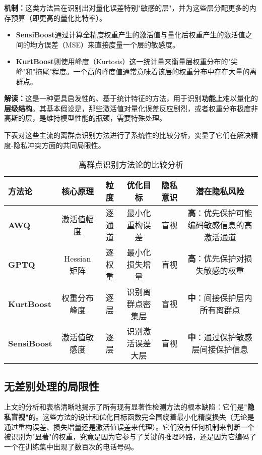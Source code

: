 \documentclass[letterpaper,twocolumn,10pt]{article}
\begin{document}
\textbf{机制：}这类方法旨在识别出对量化误差特别"敏感的层"，并为这些层分配更多的内存预算（即更高的量化比特率）。
\begin{itemize}
\item \textbf{SensiBoost}通过计算全精度权重产生的激活值与量化后权重产生的激活值之间的均方误差（MSE）来直接度量一个层的敏感度。
\item \textbf{KurtBoost}则使用峰度（Kurtosis）这一统计量来衡量层权重分布的"尖峰"和"拖尾"程度。一个高的峰度值通常意味着该层的权重分布中存在大量的离群点。
\end{itemize}

\textbf{解读：}这是一种更具启发性的、基于统计特征的方法，用于识别\textbf{功能上}难以量化的\textbf{层级结构}。其基本假设是，那些激活值对量化误差反应剧烈，或者权重分布极度非高斯的层，是维持模型性能的瓶颈，需要特殊处理。

下表对这些主流的离群点识别方法进行了系统性的比较分析，突显了它们在解决精度-隐私冲突方面的共同局限性。

\begin{table*}[t]
\centering
\caption{离群点识别方法论的比较分析}
\footnotesize
\begin{tabular}{@{}lccccc@{}}
\toprule
方法论 & 核心原理 & 粒度 & 优化目标 & 隐私意识 & 潜在隐私风险 \\ 
\midrule
\textbf{AWQ} & 激活值幅度 & 逐通道 & 最小化重构误差 & 盲视 & \textbf{高}：优先保护可能编码敏感信息的高激活通道 \\
\textbf{GPTQ} & Hessian矩阵 & 逐权重 & 最小化损失增量 & 盲视 & \textbf{高}：优先保护对损失敏感的权重 \\
\textbf{KurtBoost} & 权重分布峰度 & 逐层 & 识别离群点密集层 & 盲视 & \textbf{中}：间接保护层内所有离群点 \\
\textbf{SensiBoost} & 激活值敏感度 & 逐层 & 识别激活误差大层 & 盲视 & \textbf{中}：通过保护敏感层间接保护信息 \\
\bottomrule
\end{tabular}
\end{table*}

\subsection{无差别处理的局限性}

上文的分析和表格清晰地揭示了所有现有显著性检测方法的根本缺陷：它们是\textbf{"隐私盲视"}的。这些方法的设计和优化目标函数完全围绕着最小化精度损失（无论是通过重构误差、损失增量还是激活值误差来代理）。它们没有任何机制来判断一个被识别为"显著"的权重，究竟是因为它参与了关键的推理环路，还是因为它编码了一个在训练集中出现了数百次的电话号码。
\end{document}
